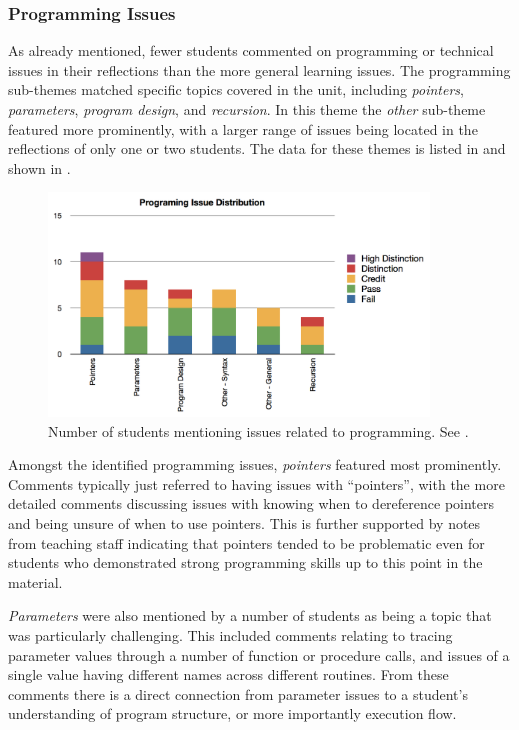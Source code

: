 \subsubsection{Programming Issues} %
\label{sub:programming_issues}

As already mentioned, fewer students commented on programming or technical issues in their reflections than the more general learning issues. The programming sub-themes matched specific topics covered in the unit, including \emph{pointers}, \emph{parameters}, \emph{program design}, and \emph{recursion}. In this theme the \emph{other} sub-theme featured more prominently, with a larger range of issues being located in the reflections of only one or two students. The data for these themes is listed in  and shown in .

\begin{figure}[htbp]
	\centering
	\includegraphics[width=0.9\textwidth]{ProgrammingIssues}
	\caption{Number of students mentioning issues related to programming. See .}
	\label{fig:programming_issues}
\end{figure}

Amongst the identified programming issues, \emph{pointers} featured most prominently. Comments typically just referred to having issues with ``pointers'', with the more detailed comments discussing issues with knowing when to dereference pointers and being unsure of when to use pointers. This is further supported by notes from teaching staff indicating that pointers tended to be problematic even for students who demonstrated strong programming skills up to this point in the material.

\emph{Parameters} were also mentioned by a number of students as being a topic that was particularly challenging. This included comments relating to tracing parameter values through a number of function or procedure calls, and issues of a single value having different names across different routines. From these comments there is a direct connection from parameter issues to a student's understanding of program structure, or more importantly execution flow.

